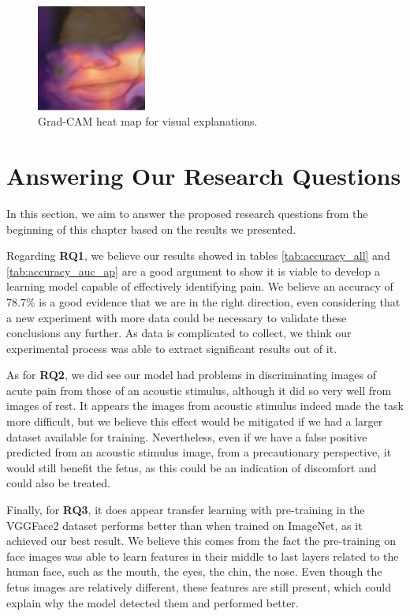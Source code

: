 \begin{figure}[h!tp]
    \centering
    \includegraphics[width=0.32\textwidth]{imgs/chap6_gradcam.png}
    \caption{Grad-CAM heat map for visual explanations.}
    \label{fig:gradcam}
\end{figure}

\section{Answering Our Research Questions}

In this section, we aim to answer the proposed research questions from the beginning of this chapter based on the results we presented.

Regarding \textbf{RQ1}, we believe our results showed in tables \ref{tab:accuracy_all} and \ref{tab:accuracy_auc_ap} are a good argument to show it is viable to develop a learning model capable of effectively identifying pain. We believe an accuracy of 78.7\% is a good evidence that we are in the right direction, even considering that a new experiment with more data could be necessary to validate these conclusions any further. As data is complicated to collect, we think our experimental process was able to extract significant results out of it.

As for \textbf{RQ2}, we did see our model had problems in discriminating images of acute pain from those of an acoustic stimulus, although it did so very well from images of rest. It appears the images from acoustic stimulus indeed made the task more difficult, but we believe this effect would be mitigated if we had a larger dataset available for training. Nevertheless, even if we have a false positive predicted from an acoustic stimulus image, from a precautionary perspective, it would still benefit the fetus, as this could be an indication of discomfort and could also be treated.

Finally, for \textbf{RQ3}, it does appear transfer learning with pre-training in the VGGFace2 dataset performs better than when trained on ImageNet, as it achieved our best result. We believe this comes from the fact the pre-training on face images was able to learn features in their middle to last layers related to the human face, such as the mouth, the eyes, the chin, the nose. Even though the fetus images are relatively different, these features are still present, which could explain why the model detected them and performed better. 

